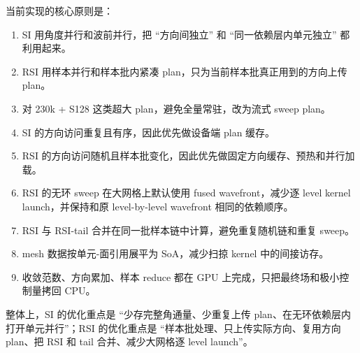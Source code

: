 \documentclass[10pt]{article}
\newcommand{\sect}[1]{\vspace{3mm}{\sffamily\Large\bfseries\color{titleblue} #1}\par\vspace{1mm}{\color{titleblue}\rule{\linewidth}{0.45pt}}\vspace{1mm}}
\begin{document}
\sect{10. 当前优化逻辑总结}

当前实现的核心原则是：

\begin{enumerate}
\item SI 用角度并行和波前并行，把 ``方向间独立'' 和 ``同一依赖层内单元独立'' 都利用起来。
\item RSI 用样本并行和样本批内紧凑 plan，只为当前样本批真正用到的方向上传 plan。
\item 对 230k + S128 这类超大 plan，避免全量常驻，改为流式 sweep plan。
\item SI 的方向访问重复且有序，因此优先做设备端 plan 缓存。
\item RSI 的方向访问随机且样本批变化，因此优先做固定方向缓存、预热和并行加载。
\item RSI 的无环 sweep 在大网格上默认使用 fused wavefront，减少逐 level kernel launch，并保持和原 level-by-level wavefront 相同的依赖顺序。
\item RSI 与 RSI-tail 合并在同一批样本链中计算，避免重复随机链和重复 sweep。
\item mesh 数据按单元-面引用展平为 SoA，减少扫掠 kernel 中的间接访存。
\item 收敛范数、方向累加、样本 reduce 都在 GPU 上完成，只把最终场和极小控制量拷回 CPU。
\end{enumerate}

整体上，SI 的优化重点是 ``少存完整角通量、少重复上传 plan、在无环依赖层内打开单元并行''；RSI 的优化重点是 ``样本批处理、只上传实际方向、复用方向 plan、把 RSI 和 tail 合并、减少大网格逐 level launch''。
\end{document}
